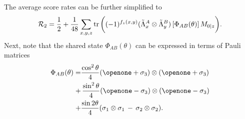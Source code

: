 \documentclass[aps,superscriptaddress,twocolumn,twoside,floatfix,pra,nofootinbib,a4paper]{revtex4-2}
\newcommand{\moha}[1]{\textit{\small\textcolor{cyan}{moha: #1}}}
\begin{document}
The average score rates can be further simplified to
\begin{equation}\label{c5}
 	\mathcal{R}_2
 =\frac{1}{2}+\frac{1}{48}\sum_{x,y,z}\tr\bigg((-1)^{f_z(x,y)}(\tilde{\Lambda}^A_{x} \otimes \tilde{\Lambda}^B_{y})\, [\Phi_{AB}(\theta)] \, M_{0|z}\bigg).
\end{equation}
Next, note that the shared state $\Phi_{AB}(\theta)$ can be expressed in terms of Pauli matrices
\begin{align}
	\Phi_{AB}(\theta)=&\frac{\cos^2{\theta}}{4}(\openone+\sigma_3)\otimes (\openone+\sigma_3) \nonumber\\
 +&\,\frac{\sin^2{\theta} }{4}(\openone-\sigma_3)\otimes (\openone-\sigma_3)\nonumber\\
 +& \frac{\sin{2\theta}}{4}(\sigma_1\otimes \sigma_1\,-\, \sigma_2\otimes \sigma_2).
 \label{eq: Pure state Pauli}
\end{align}
\end{document}
